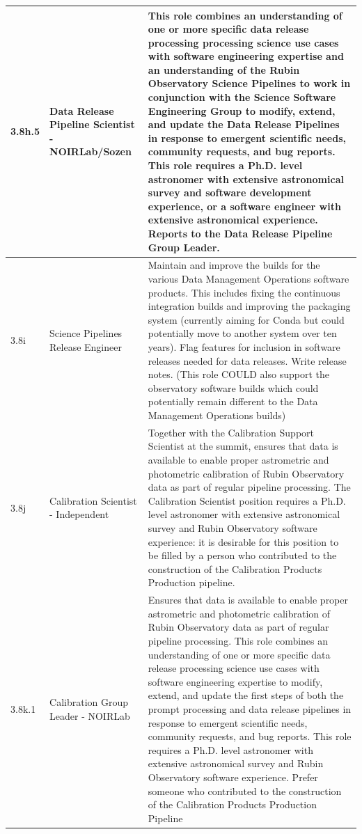 \begin{longtable} {|p{}|p{}|p{}|}
{3.8h.5}&{Data Release Pipeline Scientist - NOIRLab/Sozen}&{This role combines an understanding of one or more specific data release processing processing science use cases with software engineering expertise and an understanding of the Rubin Observatory Science Pipelines to work in conjunction with the Science Software Engineering Group to modify, extend, and update the Data Release Pipelines in response to emergent scientific needs, community requests, and bug reports. This role requires a Ph.D. level astronomer with extensive astronomical survey and software development experience, or a software engineer with extensive astronomical experience. Reports to the Data Release Pipeline Group Leader.} \\ \hline
{3.8i}&{Science Pipelines Release Engineer}&{Maintain and improve the builds for the various Data Management Operations software products. This includes fixing the continuous integration builds and improving the packaging system (currently aiming for Conda but could potentially move to another system over ten years). Flag features for inclusion in software releases needed for data releases. Write release notes. (This role COULD also support the observatory software builds which could potentially remain different to the Data Management Operations builds)} \\ \hline
{3.8j}&{Calibration Scientist - Independent}&{Together with the Calibration Support Scientist at the summit, ensures that data is available to enable proper astrometric and photometric calibration of Rubin Observatory data as part of regular pipeline processing. The Calibration Scientist position requires a Ph.D. level astronomer with extensive astronomical survey and Rubin Observatory software experience: it is desirable for this position to be filled by a person who contributed to the construction of the Calibration Products Production pipeline.} \\ \hline
{3.8k.1}&{Calibration Group Leader - NOIRLab}&{Ensures that data is available to enable proper astrometric and photometric calibration of Rubin Observatory data as part of regular pipeline processing. This role combines an understanding of one or more specific data release processing science use cases with software engineering expertise to modify, extend, and update the first steps of both the prompt processing and data release pipelines in response to emergent scientific needs, community requests, and bug reports. This role requires a Ph.D. level astronomer with extensive astronomical survey and Rubin Observatory software experience. Prefer someone who contributed to the construction of the Calibration Products Production Pipeline} \\ \hline

\end{longtable}
